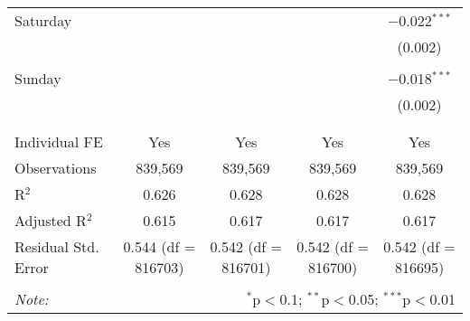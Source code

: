 \documentclass[
]{article}
\begin{document}
\begin{table}[!htbp]
{\begin{tabular}{@{\extracolsep{5pt}}lcccc}
 Saturday &  &  &  & $-$0.022$^{***}$ \\ 
  &  &  &  & (0.002) \\ 
  & & & & \\ 
 Sunday &  &  &  & $-$0.018$^{***}$ \\ 
  &  &  &  & (0.002) \\ 
  & & & & \\ 
\hline \\[-1.8ex] 
Individual FE & Yes & Yes & Yes & Yes \\ 
Observations & 839,569 & 839,569 & 839,569 & 839,569 \\ 
R$^{2}$ & 0.626 & 0.628 & 0.628 & 0.628 \\ 
Adjusted R$^{2}$ & 0.615 & 0.617 & 0.617 & 0.617 \\ 
Residual Std. Error & 0.544 (df = 816703) & 0.542 (df = 816701) & 0.542 (df = 816700) & 0.542 (df = 816695) \\ 
\hline 
\hline \\[-1.8ex] 
\textit{Note:}  & \multicolumn{4}{r}{$^{*}$p$<$0.1; $^{**}$p$<$0.05; $^{***}$p$<$0.01} \\ 
\end{tabular}
} 
\end{table} 
\newpage
\end{document}
